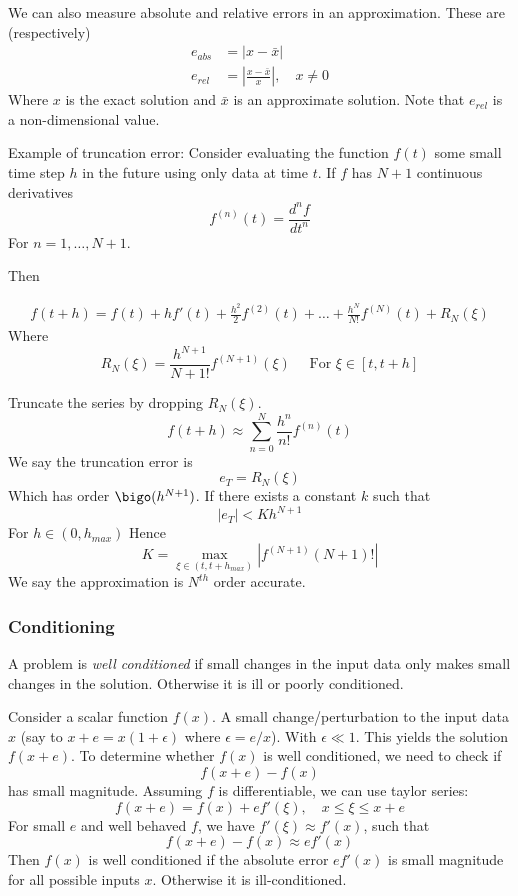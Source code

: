 \documentclass{X:/Documents/Coding/Latex/myassignment}
\begin{document}
We can also measure absolute and relative errors in an approximation. These are (respectively)
\begin{align*}
    e_{abs} &= |x-\bar{x}|\\
    e_{rel} &= \left|\frac{x-\bar{x}}{x}\right|,\quad x\neq 0
\end{align*}
Where $x$ is the exact solution and $\bar{x}$ is an approximate solution. Note that $e_{rel}$ is a non-dimensional value.


Example of truncation error:
Consider evaluating the function $f(t)$ some small time step $h$ in the future using only data at time $t$. If $f$ has $N+1$ continuous derivatives
\[f^{(n)}(t) = \frac{d^nf}{dt^n}\]
For $n=1,\ldots, N+1$.

Then

\begin{align*}
    f(t+h) = f(t) + hf'(t) + \frac{h^2}{2} f^{(2)}(t) + \ldots + \frac{h^{N}}{N!} f^{(N)}(t) + R_N(\xi)
\end{align*}
Where
\[R_N(\xi) = \frac{h^{N+1}}{N+1!} f^{(N+1)}(\xi)\quad \text{ For }\xi \in \left[t, t+h\right]\]

Truncate the series by dropping $R_N(\xi)$. 
\[f(t+h) \approx \sum_{n=0}^N \frac{h^n}{n!} f^{(n)}(t)\]
We say the truncation error is 
\[e_T = R_N(\xi)\]
Which has order $\bigo(h^{N+1})$. If there exists a constant $k$ such that 
\[|e_T| < K h^{N+1}\]
For $h \in \left(0,h_{max}\right)$
Hence
\[K = \max_{\xi \in (t, t+h_{max})} \left|f^{(N+1)}{(N+1)!}\right|\]
We say the approximation is $N^{th}$ order accurate.

\subsubsection{Conditioning}
A problem is \textit{well conditioned} if small changes in the input data only makes small changes in the solution. Otherwise it is ill or poorly conditioned.

Consider a scalar function $f(x)$. A small change/perturbation to the input data $x$ (say to $x+e = x(1+\epsilon)$ where $\epsilon = e/x$). With $\epsilon \ll 1$.
This yields the solution $f(x+e)$. To determine whether $f(x)$ is well conditioned, we need to check if
\[f(x+e) - f(x)\]
has small magnitude. Assuming $f$ is differentiable, we can use taylor series:
\[f(x+e) = f(x) + ef'(\xi), \quad x \leq \xi \leq x +e\]
For small $e$ and well behaved $f$, we have $f'(\xi) \approx f'(x)$, such that
\[f(x+e) - f(x) \approx e f'(x)\]
Then $f(x)$ is well conditioned if the absolute error $ef'(x)$ is small magnitude for all possible inputs $x$. Otherwise it is ill-conditioned.
\end{document}
